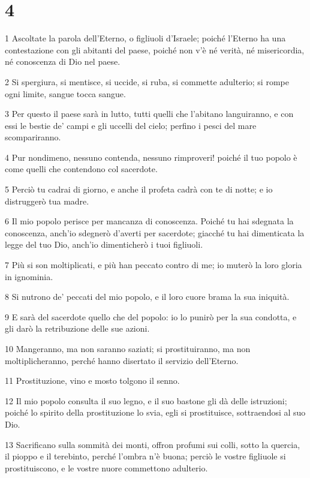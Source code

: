 \chapter{4}

\par 1 Ascoltate la parola dell'Eterno, o figliuoli d'Israele; poiché l'Eterno ha una contestazione con gli abitanti del paese, poiché non v'è né verità, né misericordia, né conoscenza di Dio nel paese.
\par 2 Si spergiura, si mentisce, si uccide, si ruba, si commette adulterio; si rompe ogni limite, sangue tocca sangue.
\par 3 Per questo il paese sarà in lutto, tutti quelli che l'abitano languiranno, e con essi le bestie de' campi e gli uccelli del cielo; perfino i pesci del mare scompariranno.
\par 4 Pur nondimeno, nessuno contenda, nessuno rimproveri! poiché il tuo popolo è come quelli che contendono col sacerdote.
\par 5 Perciò tu cadrai di giorno, e anche il profeta cadrà con te di notte; e io distruggerò tua madre.
\par 6 Il mio popolo perisce per mancanza di conoscenza. Poiché tu hai sdegnata la conoscenza, anch'io sdegnerò d'averti per sacerdote; giacché tu hai dimenticata la legge del tuo Dio, anch'io dimenticherò i tuoi figliuoli.
\par 7 Più si son moltiplicati, e più han peccato contro di me; io muterò la loro gloria in ignominia.
\par 8 Si nutrono de' peccati del mio popolo, e il loro cuore brama la sua iniquità.
\par 9 E sarà del sacerdote quello che del popolo: io lo punirò per la sua condotta, e gli darò la retribuzione delle sue azioni.
\par 10 Mangeranno, ma non saranno saziati; si prostituiranno, ma non moltiplicheranno, perché hanno disertato il servizio dell'Eterno.
\par 11 Prostituzione, vino e mosto tolgono il senno.
\par 12 Il mio popolo consulta il suo legno, e il suo bastone gli dà delle istruzioni; poiché lo spirito della prostituzione lo svia, egli si prostituisce, sottraendosi al suo Dio.
\par 13 Sacrificano sulla sommità dei monti, offron profumi sui colli, sotto la quercia, il pioppo e il terebinto, perché l'ombra n'è buona; perciò le vostre figliuole si prostituiscono, e le vostre nuore commettono adulterio.
